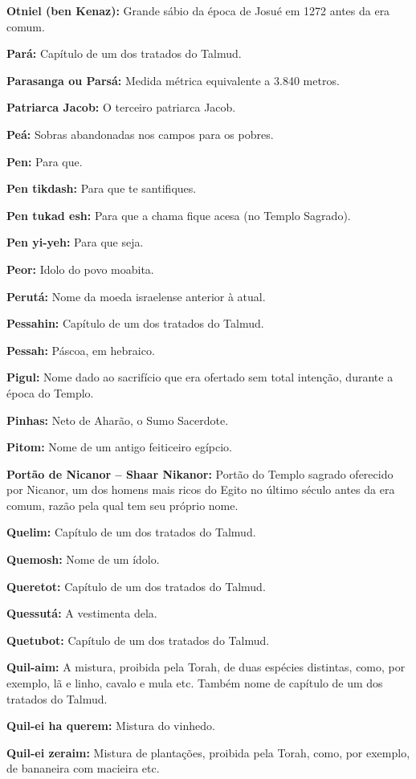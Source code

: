 \begin{hangparas}{.25in}{1}
{\textbf{Otniel (ben Kenaz):} Grande sábio da época de Josué em 1272 antes da era comum.

\textbf{Pará:} Capítulo de um dos tratados do Talmud.

\textbf{Parasanga ou Parsá:} Medida métrica equivalente a 3.840 metros.

\textbf{Patriarca Jacob:} O terceiro patriarca Jacob.

\textbf{Peá:} Sobras abandonadas nos campos para os pobres.

\textbf{Pen:} Para que.

\textbf{Pen tikdash:} Para que te santifiques.

\textbf{Pen tukad esh:} Para que a chama fique acesa (no Templo Sagrado).

\textbf{Pen yi-yeh:} Para que seja.

\textbf{Peor:} Idolo do povo moabita.

\textbf{Perutá:} Nome da moeda israelense anterior à atual.

\textbf{Pessahin:} Capítulo de um dos tratados do Talmud.

\textbf{Pessah:} Páscoa, em hebraico.

\textbf{Pigul:} Nome dado ao sacrifício que era ofertado sem total
intenção, durante a época do Templo.

\textbf{Pinhas:} Neto de Aharão, o Sumo Sacerdote.

\textbf{Pitom:} Nome de um antigo feiticeiro egípcio.

\textbf{Portão de Nicanor -- Shaar Nikanor:} Portão do Templo sagrado
oferecido por Nicanor, um dos homens mais ricos do Egito no último
século antes da era comum, razão pela qual tem seu próprio nome.

\textbf{Quelim:} Capítulo de um dos tratados do Talmud.

\textbf{Quemosh:} Nome de um ídolo.

\textbf{Queretot:} Capítulo de um dos tratados do Talmud.

\textbf{Quessutá:} A vestimenta dela.

\textbf{Quetubot:} Capítulo de um dos tratados do Talmud.

\textbf{Quil-aim:} A mistura, proibida pela Torah, de duas espécies
distintas, como, por exemplo, lã e linho, cavalo e mula etc. Também
nome de capítulo de um dos tratados do Talmud.

\textbf{Quil-ei ha querem:} Mistura do vinhedo.

\textbf{Quil-ei zeraim:} Mistura de plantações, proibida pela Torah,
como, por exemplo, de bananeira com macieira etc.

}
\end{hangparas}
